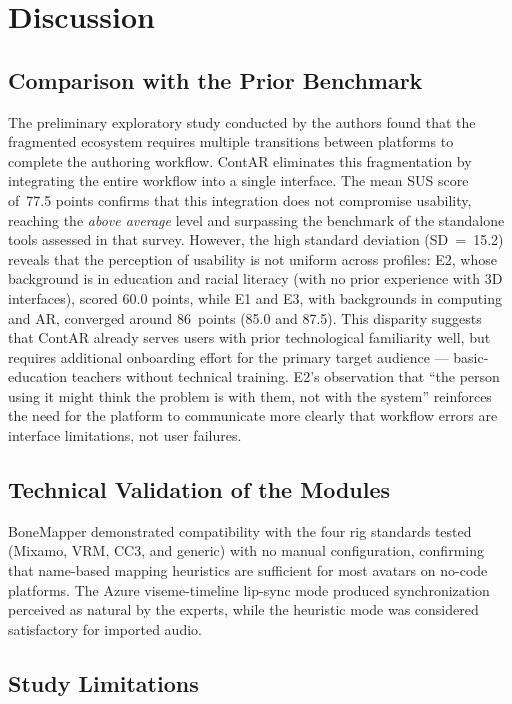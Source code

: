 \documentclass[conference]{IEEEtran}
\begin{document}
\section{Discussion}

\subsection{Comparison with the Prior Benchmark}

The preliminary exploratory study conducted by the authors found that the
fragmented ecosystem requires multiple transitions between platforms to
complete the authoring workflow. ContAR eliminates this fragmentation by
integrating the entire workflow into a single interface. The mean SUS score
of~77.5 points confirms that this integration does not compromise usability,
reaching the \textit{above average} level and surpassing the benchmark of the
standalone tools assessed in that survey. However, the high standard
deviation (SD~=~15.2) reveals that the perception of usability is not uniform
across profiles: E2, whose background is in education and racial literacy
(with no prior experience with 3D interfaces), scored 60.0 points, while E1
and E3, with backgrounds in computing and AR, converged around 86~points
(85.0 and 87.5). This disparity suggests that ContAR already serves users
with prior technological familiarity well, but requires additional onboarding
effort for the primary target audience --- basic-education teachers without
technical training. E2's observation that ``the person using it might think
the problem is with them, not with the system'' reinforces the need for the
platform to communicate more clearly that workflow errors are interface
limitations, not user failures.

\subsection{Technical Validation of the Modules}

BoneMapper demonstrated compatibility with the four rig standards tested
(Mixamo, VRM, CC3, and generic) with no manual configuration, confirming
that name-based mapping heuristics are sufficient for most avatars on
no-code platforms. The Azure viseme-timeline lip-sync mode produced
synchronization perceived as natural by the experts, while the heuristic
mode was considered satisfactory for imported audio.

\subsection{Study Limitations}
\end{document}
